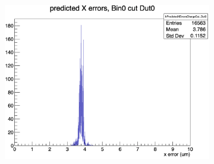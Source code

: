\begin{figure}[H]
\begin{subfigure}[b]{0.3\textwidth}
        \includegraphics[width=\textwidth]{images/XPredError_4pixel_noBin0.png}
        \caption{}
    \end{subfigure}

    \vspace{0.5cm} %


\end{figure}
